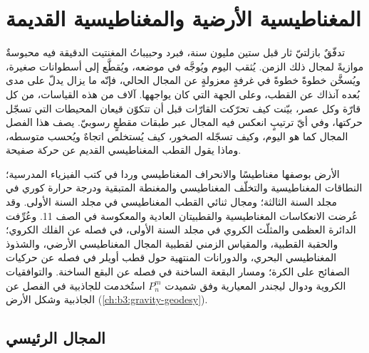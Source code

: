 \chapter{المغناطيسية الأرضية والمغناطيسية القديمة}\label{ch:b3:palaeomagnetism}

تدفّقٌ بازلتيّ ثار قبل ستين مليون سنة، فبرد وحبيباتُ المغنتيت الدقيقة فيه
محبوسةٌ موازيةً لمجال ذلك الزمن. يُثقب اليوم ويُوجَّه في
موضعه، ويُقطَّع إلى أسطوانات صغيرة، ويُسخَّن
خطوةً خطوةً في غرفةٍ معزولةٍ عن المجال الحالي، فإنّه ما يزال يدلّ على مدى بُعده
آنذاك عن القطب، وعلى الجهة التي كان يواجهها. آلاف من هذه
القياسات، من كل قارّة وكل عصر، بيّنت كيف تحرّكت القارّات
قبل أن تتكوّن قيعان المحيطات التي تسجّل حركتها، وفي أيّ
ترتيبٍ انعكس فيه المجال عبر طبقات
مقطعٍ رسوبيّ. يصف هذا الفصل المجال كما هو اليوم، وكيف تسجّله الصخور،
كيف يُستخلص اتجاهٌ ويُحسب متوسطه، وماذا يقول القطب المغناطيسي القديم
عن حركة صفيحة.

\begin{recall}
الأرض بوصفها مغناطيسًا والانحراف المغناطيسي وردا في كتب الفيزياء
المدرسية؛ النطاقات المغناطيسية والتخلّف المغناطيسي والمغنطة المتبقية ودرجة حرارة كوري
في مجلد السنة الثالثة؛ ومجال ثنائي القطب المغناطيسي في
مجلد السنة الأولى. وقد عُرضت الانعكاسات المغناطيسية والقطبيتان العادية والمعكوسة
في الصف 11. وعُرِّفت الدائرة العظمى والمثلّث الكروي في
مجلد السنة الأولى، في فصله عن الفلك الكروي؛ والحقبة القطبية،
والمقياس الزمني لقطبية المجال المغناطيسي الأرضي، والشذوذ المغناطيسي البحري، والدورانات المنتهية
حول قطب أويلر في فصله عن حركيات الصفائح على الكرة؛
ومسار البقعة الساخنة في فصله عن البقع الساخنة. والتوافقيات الكروية
ودوال ليجندر المعيارية وفق شميدت $P_n^m$ استُخدمت للجاذبية في
الفصل عن الجاذبية وشكل الأرض (\cref{ch:b3:gravity-geodesy}).
\end{recall}

\section{المجال الرئيسي}

